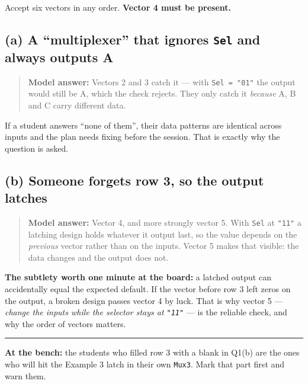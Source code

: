 \documentclass[11pt]{article}
\newcommand{\code}[1]{\texttt{#1}}
\newcommand{\hr}{\vspace{2pt}\hrule\vspace{6pt}}
\begin{document}
Accept six vectors in any order. \textbf{Vector 4 must be present.}

\subsection*{(a) A ``multiplexer'' that ignores \code{Sel} and always outputs A}

\begin{quote}
\textbf{Model answer:} Vectors 2 and 3 catch it --- with \code{Sel = "01"} the
output would still be A, which the check rejects. They only catch it
\emph{because} A, B and C carry different data.
\end{quote}

If a student answers ``none of them'', their data patterns are identical across
inputs and the plan needs fixing before the session. That is exactly why the
question is asked.

\subsection*{(b) Someone forgets row 3, so the output latches}

\begin{quote}
\textbf{Model answer:} Vector 4, and more strongly vector 5. With \code{Sel} at
\code{"11"} a latching design holds whatever it output last, so the value depends
on the \emph{previous} vector rather than on the inputs. Vector 5 makes that
visible: the data changes and the output does not.
\end{quote}

\textbf{The subtlety worth one minute at the board:} a latched output can
accidentally equal the expected default. If the vector before row 3 left zeros on
the output, a broken design passes vector 4 by luck. That is why vector 5 ---
\emph{change the inputs while the selector stays at \code{"11"}} --- is the
reliable check, and why the order of vectors matters.

\vspace{6pt}
\hr
{\small \textbf{At the bench:} the students who filled row 3 with a blank in Q1(b)
are the ones who will hit the Example 3 latch in their own \code{Mux3}. Mark that
part first and warn them.}
\end{document}
